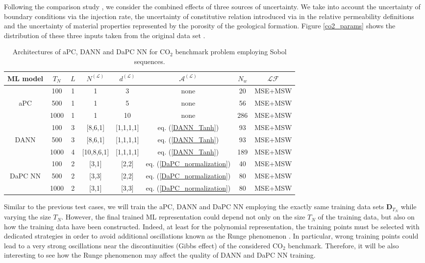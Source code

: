 \documentclass[a4paper,fleqn]{article}
\begin{document}
Following the comparison study \cite{koppel2019comparison}, we consider the combined effects of three sources of uncertainty.  We take into account the uncertainty of boundary conditions via the injection rate, the uncertainty of constitutive relation introduced via in the relative permeability definitions and the uncertainty of material properties represented by the porosity of the geological formation. Figure \ref{co2_params} shows the distribution of these three inputs taken from the original data set \cite{BenchmarkData}. 

%
\begin{table}
\caption{Architectures of aPC, DANN and DaPC NN for CO$_2$ benchmark problem employing Sobol sequences.}
\label{CO2TestCase}       
\begin{tabular}{| c | c |c | c | c | c | c | c |}
    \hline
    ML model & $T_N$ & $L$ & $N^{(\mathcal{L})}$ & $d^{(\mathcal{L})}$ & $\mathcal{A}^{(\mathcal{L})}$ & $N_w$ & $\mathcal{LF}$\\
    \hline \hline 
    & 100 & 1 & 1 & 3 & none & 20 & MSE+MSW\\
    aPC & 500 & 1 & 1 & 5 & none & 56 & MSE+MSW\\
    & 1000 & 1 & 1 & 10 & none & 286 & MSE+MSW\\
    \hline
    & 100 & 3 & [8,6,1] & [1,1,1,1]  & eq. (\ref{DANN_Tanh}) & 93 & MSE+MSW\\
    DANN & 500 & 3 & [8,6,1] & [1,1,1,1] & eq. (\ref{DANN_Tanh}) & 93 & MSE+MSW\\
    & 1000 & 4 & [10,8,6,1] & [1,1,1,1] & eq. (\ref{DANN_Tanh}) & 189 & MSE+MSW\\
    \hline  
    & 100 & 2 & [3,1] & [2,2] & eq. (\ref{DaPC_normalization}) & 40 & MSE+MSW\\
    DaPC NN & 500 & 2 & [3,3] & [2,2] & eq. (\ref{DaPC_normalization}) & 80 & MSE+MSW\\
    & 1000 & 2 & [3,1] & [3,3] & eq. (\ref{DaPC_normalization}) & 80 & MSE+MSW\\
    \hline      
\end{tabular}
\end{table}
%
Similar to the previous test cases, we will train the aPC, DANN and DaPC NN employing the exactly same training data sets $\bm{D}_{T_N}$ while varying the size $T_N$.  However, the final trained ML representation could depend not only on the size $T_N$ of the training data, but also on how the training data have been constructed. Indeed, at least for the polynomial representation, the training points must be selected with dedicated strategies in order to avoid additional oscillations known as the Runge phenomenon \cite{runge1901empirische}. In particular, wrong training points could lead to a very strong oscillations near the discontinuities (Gibbs effect) of the considered CO$_2$ benchmark. Therefore, it will be also interesting to see how the Runge phenomenon may affect the quality of DANN and DaPC NN training. 
\end{document}
